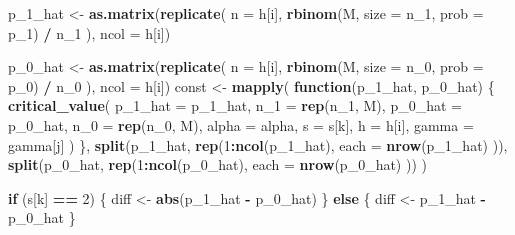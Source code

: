 \documentclass[
]{article}
\newenvironment{Shaded}{\begin{snugshade}}{\end{snugshade}}
\newcommand{\ControlFlowTok}[1]{\textcolor[rgb]{0.13,0.29,0.53}{\textbf{#1}}}
\newcommand{\DataTypeTok}[1]{\textcolor[rgb]{0.13,0.29,0.53}{#1}}
\newcommand{\DecValTok}[1]{\textcolor[rgb]{0.00,0.00,0.81}{#1}}
\newcommand{\KeywordTok}[1]{\textcolor[rgb]{0.13,0.29,0.53}{\textbf{#1}}}
\newcommand{\NormalTok}[1]{#1}
\newcommand{\OperatorTok}[1]{\textcolor[rgb]{0.81,0.36,0.00}{\textbf{#1}}}
\newcommand{\StringTok}[1]{\textcolor[rgb]{0.31,0.60,0.02}{#1}}
\begin{document}
\begin{Shaded}
\begin{Highlighting}[]
{\NormalTok{      p_}\DecValTok{1}\NormalTok{_hat <-}\StringTok{ }\KeywordTok{as.matrix}\NormalTok{(}\KeywordTok{replicate}\NormalTok{(}
        \DataTypeTok{n =}\NormalTok{ h[i],}
        \KeywordTok{rbinom}\NormalTok{(M, }\DataTypeTok{size =}\NormalTok{ n_}\DecValTok{1}\NormalTok{, }\DataTypeTok{prob =}\NormalTok{ p_}\DecValTok{1}\NormalTok{) }\OperatorTok{/}\StringTok{ }\NormalTok{n_}\DecValTok{1}
\NormalTok{      ), }\DataTypeTok{ncol =}\NormalTok{ h[i])}

\NormalTok{      p_}\DecValTok{0}\NormalTok{_hat <-}\StringTok{ }\KeywordTok{as.matrix}\NormalTok{(}\KeywordTok{replicate}\NormalTok{(}
        \DataTypeTok{n =}\NormalTok{ h[i],}
        \KeywordTok{rbinom}\NormalTok{(M, }\DataTypeTok{size =}\NormalTok{ n_}\DecValTok{0}\NormalTok{, }\DataTypeTok{prob =}\NormalTok{ p_}\DecValTok{0}\NormalTok{) }\OperatorTok{/}\StringTok{ }\NormalTok{n_}\DecValTok{0}
\NormalTok{      ), }\DataTypeTok{ncol =}\NormalTok{ h[i])}
\NormalTok{      const <-}\StringTok{ }\KeywordTok{mapply}\NormalTok{(}
        \ControlFlowTok{function}\NormalTok{(p_}\DecValTok{1}\NormalTok{_hat, p_}\DecValTok{0}\NormalTok{_hat) \{}
          \KeywordTok{critical_value}\NormalTok{(}
            \DataTypeTok{p_1_hat =}\NormalTok{ p_}\DecValTok{1}\NormalTok{_hat, }\DataTypeTok{n_1 =} \KeywordTok{rep}\NormalTok{(n_}\DecValTok{1}\NormalTok{, M),}
            \DataTypeTok{p_0_hat =}\NormalTok{ p_}\DecValTok{0}\NormalTok{_hat, }\DataTypeTok{n_0 =} \KeywordTok{rep}\NormalTok{(n_}\DecValTok{0}\NormalTok{, M),}
            \DataTypeTok{alpha =}\NormalTok{ alpha, }\DataTypeTok{s =}\NormalTok{ s[k], }\DataTypeTok{h =}\NormalTok{ h[i],}
            \DataTypeTok{gamma =}\NormalTok{ gamma[j]}
\NormalTok{          )}
\NormalTok{        \},}
        \KeywordTok{split}\NormalTok{(p_}\DecValTok{1}\NormalTok{_hat, }\KeywordTok{rep}\NormalTok{(}\DecValTok{1}\OperatorTok{:}\KeywordTok{ncol}\NormalTok{(p_}\DecValTok{1}\NormalTok{_hat),}
          \DataTypeTok{each =} \KeywordTok{nrow}\NormalTok{(p_}\DecValTok{1}\NormalTok{_hat)}
\NormalTok{        )),}
        \KeywordTok{split}\NormalTok{(p_}\DecValTok{0}\NormalTok{_hat, }\KeywordTok{rep}\NormalTok{(}\DecValTok{1}\OperatorTok{:}\KeywordTok{ncol}\NormalTok{(p_}\DecValTok{0}\NormalTok{_hat),}
          \DataTypeTok{each =} \KeywordTok{nrow}\NormalTok{(p_}\DecValTok{0}\NormalTok{_hat)}
\NormalTok{        ))}
\NormalTok{      )}

      \ControlFlowTok{if}\NormalTok{ (s[k] }\OperatorTok{==}\StringTok{ }\DecValTok{2}\NormalTok{) \{}
\NormalTok{        diff <-}\StringTok{ }\KeywordTok{abs}\NormalTok{(p_}\DecValTok{1}\NormalTok{_hat }\OperatorTok{-}\StringTok{ }\NormalTok{p_}\DecValTok{0}\NormalTok{_hat)}
\NormalTok{      \} }\ControlFlowTok{else}\NormalTok{ \{}
\NormalTok{        diff <-}\StringTok{ }\NormalTok{p_}\DecValTok{1}\NormalTok{_hat }\OperatorTok{-}\StringTok{ }\NormalTok{p_}\DecValTok{0}\NormalTok{_hat}
\NormalTok{      \}}

}
\end{Highlighting}
\end{Shaded}
\end{document}
